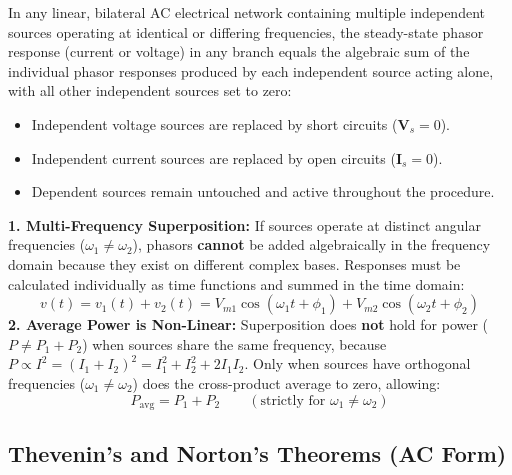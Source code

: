 \documentclass[12pt,a4paper]{article}
\begin{document}
\begin{tcolorbox}[defbox, title={\textbf{Superposition Theorem Statement}}]
In any linear, bilateral AC electrical network containing multiple independent sources operating at identical or differing frequencies, the steady-state phasor response (current or voltage) in any branch equals the algebraic sum of the individual phasor responses produced by each independent source acting alone, with all other independent sources set to zero:
\begin{itemize}[leftmargin=*, itemsep=2pt, topsep=1pt]
  \item Independent voltage sources are replaced by short circuits ($\mathbf{V}_s = 0$).
  \item Independent current sources are replaced by open circuits ($\mathbf{I}_s = 0$).
  \item Dependent sources remain untouched and active throughout the procedure.
\end{itemize}
\end{tcolorbox}

\begin{tcolorbox}[examplebox, title={\textbf{Critical Exam Caveat: Superposition with Differing Frequencies and AC Power}}]
\textbf{1. Multi-Frequency Superposition:} If sources operate at distinct angular frequencies ($\omega_1 \ne \omega_2$), phasors \textbf{cannot} be added algebraically in the frequency domain because they exist on different complex bases. Responses must be calculated individually as time functions and summed in the time domain:
\begin{equation}
  v(t) = v_1(t) + v_2(t) = V_{m1} \cos(\omega_1 t + \phi_1) + V_{m2} \cos(\omega_2 t + \phi_2)
\end{equation}
\textbf{2. Average Power is Non-Linear:} Superposition does \textbf{not} hold for power ($P \ne P_1 + P_2$) when sources share the same frequency, because $P \propto I^2 = (I_1 + I_2)^2 = I_1^2 + I_2^2 + 2 I_1 I_2$. Only when sources have orthogonal frequencies ($\omega_1 \ne \omega_2$) does the cross-product average to zero, allowing:
\begin{equation}
  P_{\text{avg}} = P_1 + P_2 \qquad (\text{strictly for } \omega_1 \ne \omega_2)
\end{equation}
\end{tcolorbox}

\subsection{Thevenin's and Norton's Theorems (AC Form)}
\end{document}
